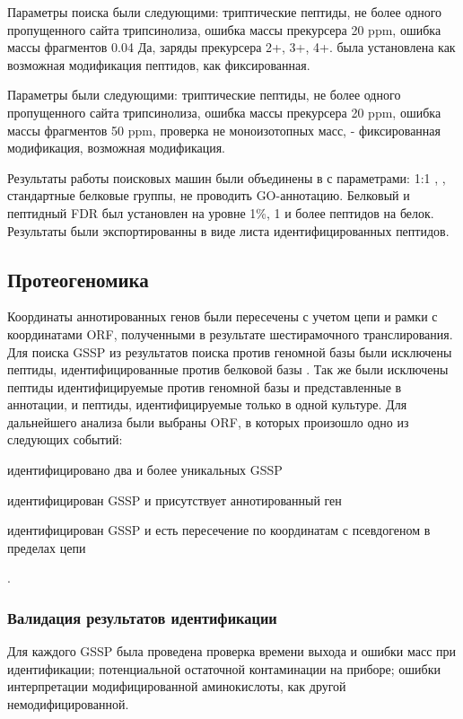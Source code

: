 Параметры поиска  были следующими: триптические пептиды, не более одного пропущенного сайта трипсинолиза, ошибка массы прекурсера 20 ppm, ошибка массы фрагментов 0.04 Да, заряды прекурсера 2+, 3+, 4+.  была установлена как возможная модификация пептидов,  как фиксированная. 

Параметры  были следующими: триптические пептиды, не более одного пропущенного сайта трипсинолиза, ошибка массы прекурсера 20 ppm, ошибка массы фрагментов 50 ppm, проверка не моноизотопных масс,  - фиксированная модификация,  возможная модификация.

Результаты работы поисковых машин были объединены в  с параметрами: 1:1 , , стандартные белковые группы, не проводить GO-аннотацию. Белковый и пептидный FDR был установлен на уровне 1\%, 1 и более пептидов на белок. Результаты были экспортированны в виде листа идентифицированных пептидов.

\subsection{Протеогеномика }
Координаты аннотированных генов были пересечены с учетом цепи и рамки с координатами ORF, полученными в результате шестирамочного транслирования.
Для поиска GSSP из результатов поиска против геномной базы  были исключены пептиды, идентифицированные против белковой базы . Так же были исключены пептиды идентифицируемые против геномной базы и представленные в аннотации, и пептиды, идентифицируемые только в одной культуре. Для дальнейшего анализа были выбраны ORF, в которых произошло одно из следующих событий:
\begin{inparaenum}
    \item идентифицировано два и более уникальных GSSP
    \item идентифицирован GSSP и присутствует аннотированный ген
    \item идентифицирован GSSP и есть пересечение по координатам с псевдогеном в пределах цепи
\end{inparaenum}.

\subsubsection{Валидация результатов идентификации}
Для каждого GSSP была проведена проверка времени выхода и ошибки масс при идентификации; потенциальной остаточной контаминации на приборе; ошибки интерпретации модифицированной аминокислоты, как другой немодифицированной.

